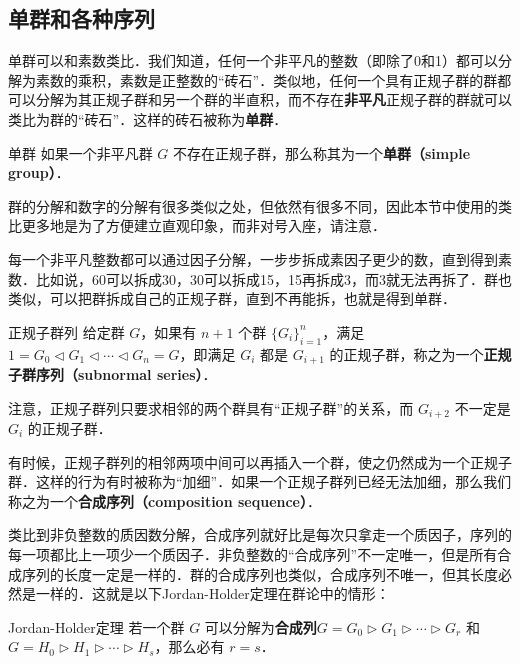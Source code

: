 

\subsection{单群和各种序列}

单群可以和素数类比．我们知道，任何一个非平凡的整数（即除了0和1）都可以分解为素数的乘积，素数是正整数的“砖石”．类似地，任何一个具有正规子群的群都可以分解为其正规子群和另一个群的半直积，而不存在\textbf{非平凡}正规子群的群就可以类比为群的“砖石”．这样的砖石被称为\textbf{单群}．

\begin{definition}{单群}
如果一个非平凡群 $G$ 不存在正规子群，那么称其为一个\textbf{单群（simple group）}．
\end{definition}

群的分解和数字的分解有很多类似之处，但依然有很多不同，因此本节中使用的类比更多地是为了方便建立直观印象，而非对号入座，请注意．

每一个非平凡整数都可以通过因子分解，一步步拆成素因子更少的数，直到得到素数．比如说，60可以拆成30，30可以拆成15，15再拆成3，而3就无法再拆了．群也类似，可以把群拆成自己的正规子群，直到不再能拆，也就是得到单群．

\begin{definition}{正规子群列}
给定群 $G$，如果有 $n+1$ 个群 $\{G_i\}_{i = 1}^n$，满足 $1 = G_0 \triangleleft G_1 \triangleleft \cdots \triangleleft G_n = G$，即满足 $G_{i}$ 都是 $G_{i+1}$ 的正规子群，称之为一个\textbf{正规子群序列（subnormal series）}．
\end{definition}

注意，正规子群列只要求相邻的两个群具有“正规子群”的关系，而 $G_{i+2}$ 不一定是 $G_i$ 的正规子群．

有时候，正规子群列的相邻两项中间可以再插入一个群，使之仍然成为一个正规子群．这样的行为有时被称为“加细”．如果一个正规子群列已经无法加细，那么我们称之为一个\textbf{合成序列（composition sequence）}．

类比到非负整数的质因数分解，合成序列就好比是每次只拿走一个质因子，序列的每一项都比上一项少一个质因子．非负整数的“合成序列”不一定唯一，但是所有合成序列的长度一定是一样的．群的合成序列也类似，合成序列不唯一，但其长度必然是一样的．这就是以下Jordan-Holder定理在群论中的情形：

\begin{definition}{Jordan-Holder定理}
若一个群 $G$ 可以分解为\textbf{合成列}$G=G_0\triangleright G_1\triangleright\cdots\triangleright G_r$ 和 $G=H_0\triangleright H_1\triangleright\cdots\triangleright H_s$，那么必有 $r=s$．
\end{definition}

